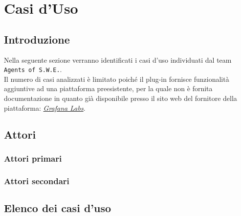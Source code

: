 \section{Casi d'Uso}\label{CasiUso}
\subsection{Introduzione}\label{CasiUso_Introduzione}
Nella seguente sezione verranno identificati i casi d'uso individuati dal team \texttt{Agents of S.W.E.}.\\
Il numero di casi analizzati è limitato poiché il plug-in fornisce funzionalità aggiuntive ad una piattaforma preesistente, per la quale non è fornita documentazione in quanto già disponibile presso il sito web del fornitore della piattaforma: \href{http://docs.grafana.org/}{\textit{Grafana Labs}}.\\

\subsection{Attori}
\subsubsection{Attori primari}


\subsubsection{Attori secondari}

\subsection{Elenco dei casi d'uso}
